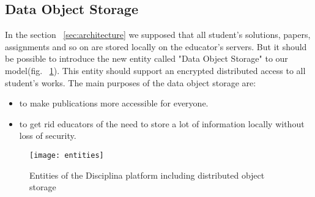 \subsection{Data Object Storage}
\label{apx:data-object-storage}

In the section ~\ref{sec:architecture} we supposed that all student's solutions,
papers, assignments and so on are stored locally on the educator's servers. But
it should be possible to introduce the new entity called "Data Object Storage"
to our model(fig. ~\ref{fig:entities}). This entity should support an encrypted
distributed access to all student's works. The main purposes of the data object
storage are:

\begin{itemize}
\item to make publications more accessible for everyone.
\item to get rid educators of the need to store a lot of information locally without loss of security.
\end{itemize}

\begin{figure}[ht]
\centering
\texttt{[image: entities]}
\caption{Entities of the Disciplina platform including distributed object storage}
\label{fig:entities}
\end{figure}
